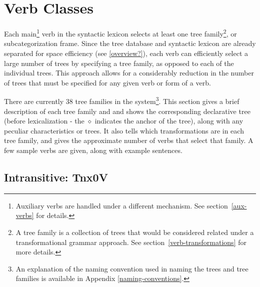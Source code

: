 \section{Verb Classes}
\label{verb-classes}

Each main\footnote{Auxiliary verbs are handled under a different mechanism.
See section~\ref{aux-verbs} for details.} verb in the syntactic lexicon selects
at least one tree family\footnote{A tree family is a collection of trees that
would be considered related under a transformational grammar approach.  See
section~\ref{verb-transformations} for more details.}, or subcategorization
frame.  Since the tree database and syntactic lexicon are already separated for
space efficiency (see \ref{overview?}), each verb can efficiently select a
large number of trees by specifying a tree family, as opposed to each of the
individual trees.  This approach allows for a considerably reduction in the
number of trees that must be specified for any given verb or form of a verb.

There are currently 38 tree families in the system\footnote{An explanation of
the naming convention used in naming the trees and tree families is available
in Appendix \ref{naming-conventions}.}.  This section gives a brief description
of each tree family and and shows the corresponding declarative tree (before
lexicalization - the $\diamond$ indicates the anchor of the tree), along with
any peculiar characteristics or trees.  It also tells which transformations are
in each tree family, and gives the approximate number of verbs that select that
family.  A few sample verbs are given, along with example sentences.


\subsection{Intransitive: Tnx0V}
\label{nx0V-family}

